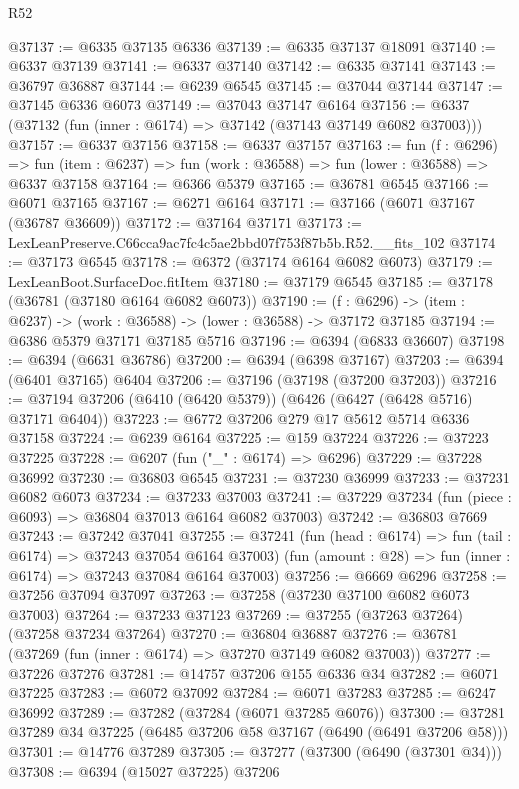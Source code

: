 \begin{lexlean}{R52}
\begin{coremodule}
@37137 := @6335 @37135 @6336
@37139 := @6335 @37137 @18091
@37140 := @6337 @37139
@37141 := @6337 @37140
@37142 := @6335 @37141
@37143 := @36797 @36887
@37144 := @6239 @6545
@37145 := @37044 @37144
@37147 := @37145 @6336 @6073
@37149 := @37043 @37147 @6164
@37156 := @6337 (@37132 (fun (inner : @6174) => @37142 (@37143 @37149 @6082 @37003)))
@37157 := @6337 @37156
@37158 := @6337 @37157
@37163 := fun (f : @6296) =>
  fun (item : @6237) => fun (work : @36588) => fun (lower : @36588) => @6337 @37158
@37164 := @6366 @5379
@37165 := @36781 @6545
@37166 := @6071 @37165
@37167 := @6271 @6164
@37171 := @37166 (@6071 @37167 (@36787 @36609))
@37172 := @37164 @37171
@37173 := LexLeanPreserve.C66cca9ac7fc4c5ae2bbd07f753f87b5b.R52.__fits_102
@37174 := @37173 @6545
@37178 := @6372 (@37174 @6164 @6082 @6073)
@37179 := LexLeanBoot.SurfaceDoc.fitItem
@37180 := @37179 @6545
@37185 := @37178 (@36781 (@37180 @6164 @6082 @6073))
@37190 := (f : @6296) -> (item : @6237) -> (work : @36588) -> (lower : @36588) -> @37172 @37185
@37194 := @6386 @5379 @37171 @37185 @5716
@37196 := @6394 (@6833 @36607)
@37198 := @6394 (@6631 @36786)
@37200 := @6394 (@6398 @37167)
@37203 := @6394 (@6401 @37165) @6404
@37206 := @37196 (@37198 (@37200 @37203))
@37216 := @37194 @37206 (@6410 (@6420 @5379)) (@6426 (@6427 (@6428 @5716) @37171 @6404))
@37223 := @6772 @37206 @279 @17 @5612 @5714 @6336 @37158
@37224 := @6239 @6164
@37225 := @159 @37224
@37226 := @37223 @37225
@37228 := @6207 (fun ("_" : @6174) => @6296)
@37229 := @37228 @36992
@37230 := @36803 @6545
@37231 := @37230 @36999
@37233 := @37231 @6082 @6073
@37234 := @37233 @37003
@37241 := @37229 @37234 (fun (piece : @6093) => @36804 @37013 @6164 @6082 @37003)
@37242 := @36803 @7669
@37243 := @37242 @37041
@37255 := @37241
    (fun (head : @6174) => fun (tail : @6174) => @37243 @37054 @6164 @37003)
    (fun (amount : @28) => fun (inner : @6174) => @37243 @37084 @6164 @37003)
@37256 := @6669 @6296
@37258 := @37256 @37094 @37097
@37263 := @37258 (@37230 @37100 @6082 @6073 @37003)
@37264 := @37233 @37123
@37269 := @37255 (@37263 @37264) (@37258 @37234 @37264)
@37270 := @36804 @36887
@37276 := @36781 (@37269 (fun (inner : @6174) => @37270 @37149 @6082 @37003))
@37277 := @37226 @37276
@37281 := @14757 @37206 @155 @6336 @34
@37282 := @6071 @37225
@37283 := @6072 @37092
@37284 := @6071 @37283
@37285 := @6247 @36992
@37289 := @37282 (@37284 (@6071 @37285 @6076))
@37300 := @37281 @37289 @34 @37225 (@6485 @37206 @58 @37167 (@6490 (@6491 @37206 @58)))
@37301 := @14776 @37289
@37305 := @37277 (@37300 (@6490 (@37301 @34)))
@37308 := @6394 (@15027 @37225) @37206

\end{coremodule}
\end{lexlean}

